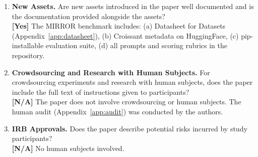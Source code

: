 \documentclass[10pt]{article}
\begin{document}
\begin{enumerate}
\item \textbf{New Assets.} Are new assets introduced in the paper well documented and is the documentation provided alongside the assets?
\\\textbf{[Yes]} The MIRROR benchmark includes: (a) Datasheet for Datasets (Appendix~\ref{app:datasheet}), (b) Croissant metadata on HuggingFace, (c) pip-installable evaluation suite, (d) all prompts and scoring rubrics in the repository.

\item \textbf{Crowdsourcing and Research with Human Subjects.} For crowdsourcing experiments and research with human subjects, does the paper include the full text of instructions given to participants?
\\\textbf{[N/A]} The paper does not involve crowdsourcing or human subjects. The human audit (Appendix~\ref{app:audit}) was conducted by the authors.

\item \textbf{IRB Approvals.} Does the paper describe potential risks incurred by study participants?
\\\textbf{[N/A]} No human subjects involved.

\end{enumerate}
\end{document}
